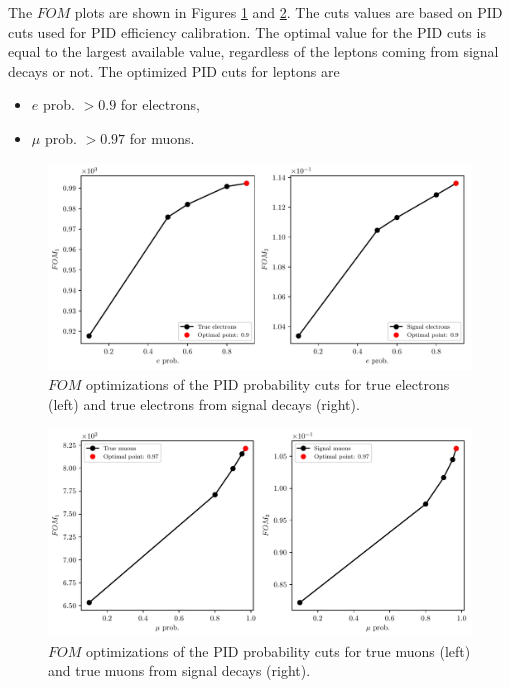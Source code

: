 \documentclass[headings=standardclasses,headings=big,oneside,a4paper,openany,12pt]{scrbook}
\begin{document}
The $FOM$ plots are shown in Figures \ref{fig:efom} and \ref{fig:mufom}. The cuts values are based on PID cuts used for PID efficiency calibration. The optimal value for the PID cuts is equal to the largest available value, regardless of the leptons coming from signal decays or not. The optimized PID cuts for leptons are
\begin{itemize}
\item $e$ prob. $ > 0.9$ for electrons,
\item $\mu$ prob. $ > 0.97$ for muons.
\end{itemize}

\begin{figure}[H]
\centering
\captionsetup{width=.8\linewidth}
\includegraphics[width=\linewidth]{fig/FSP_e_fom}
\caption{$FOM$ optimizations of the PID probability cuts for true electrons (left) and true electrons from signal decays (right).}
\label{fig:efom}
\end{figure}

\begin{figure}[H]
\centering
\captionsetup{width=.8\linewidth}
\includegraphics[width=\linewidth]{fig/FSP_mu_fom}
\caption{$FOM$ optimizations of the PID probability cuts for true muons (left) and true muons from signal decays (right).}
\label{fig:mufom}
\end{figure}
\end{document}

